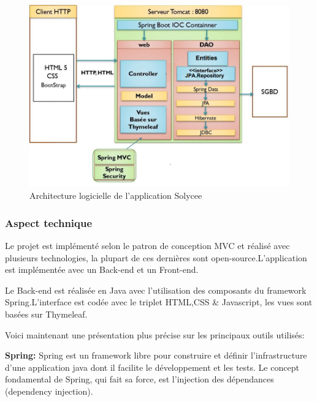 \documentclass[12pt]{article}
\begin{document}
\begin{figure}[H]
    \centering
    \includegraphics[width=0.9 \textwidth]{diagrammes/archiSolycee.png}
    \caption{Architecture logicielle de l'application Solycee }
\end{figure}

\subsubsection{Aspect technique}

Le projet est implémenté selon le patron de conception MVC et réalisé avec plusieurs technologies, la plupart de ces dernières sont open-source.L'application est implémentée avec un Back-end et un Front-end.

Le Back-end est réalisée en Java avec l'utilisation des composants du framework Spring.L'interface est codée avec le triplet HTML,CSS \& Javascript, les vues sont basées sur Thymeleaf. 

Voici maintenant une présentation plus précise sur les principaux outils utilisés:\newline

\textbf{Spring:} Spring est un framework libre pour construire et définir l'infrastructure d'une application java dont il facilite le développement et les tests. Le concept fondamental de Spring, qui fait sa force, est l'injection des dépendances (dependency injection).\newline
\end{document}
